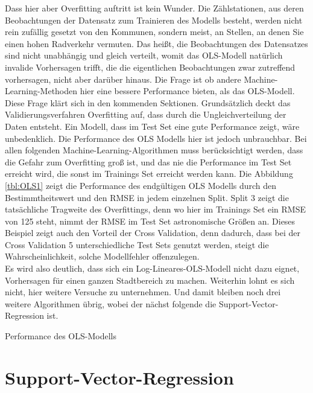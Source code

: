 \documentclass[a4paper,12pt]{thesis}
\begin{document}
Dass hier aber Overfitting auftritt ist kein Wunder. Die Zählstationen, aus deren Beobachtungen der Datensatz zum Trainieren des Modells besteht, werden nicht rein zufällig gesetzt von den Kommunen, sondern meist, an Stellen, an denen Sie einen hohen Radverkehr vermuten. Das heißt, die Beobachtungen des Datensatzes sind nicht unabhängig und gleich verteilt, womit das OLS-Modell natürlich invalide Vorhersagen trifft, die die eigentlichen Beobachtungen zwar zutreffend vorhersagen, nicht aber darüber hinaus. Die Frage ist ob andere Machine-Learning-Methoden hier eine bessere Performance bieten, als das OLS-Modell. Diese Frage klärt sich in den kommenden Sektionen. Grundsätzlich deckt das Validierungsverfahren Overfitting auf, dass durch die Ungleichverteilung der Daten entsteht. Ein Modell, dass im Test Set eine gute Performance zeigt, wäre unbedenklich. Die Performance des OLS Modells hier ist jedoch unbrauchbar. Bei allen folgenden Machine-Learning-Algorithmen muss berücksichtigt werden, dass die Gefahr zum Overfitting groß ist, und das nie die Performance im Test Set erreicht wird, die sonst im Trainings Set erreicht werden kann. Die Abbildung \ref{tbl:OLS1} zeigt die Performance des endgültigen OLS Modells durch den Bestimmtheitswert und den RMSE in jedem einzelnen Split. Split 3 zeigt die tatsächliche Tragweite des Overfittings, denn wo hier im Trainings Set ein RMSE von 125 steht, nimmt der RMSE im Test Set astronomische Größen an. Dieses Beispiel zeigt auch den Vorteil der Cross Validation, denn dadurch, dass bei der Cross Validation 5 unterschiedliche Test Sets genutzt werden, steigt die Wahrscheinlichkeit, solche Modellfehler offenzulegen.\\
Es wird also deutlich, dass sich ein Log-Lineares-OLS-Modell nicht dazu eignet, Vorhersagen für einen ganzen Stadtbereich zu machen. Weiterhin lohnt es sich nicht, hier weitere Versuche zu unternehmen. Und damit bleiben noch drei weitere Algorithmen übrig, wobei der nächst folgende die Support-Vector-Regression ist.

\begin{table}
	\caption{Performance des OLS-Modells}
	\label{tbl:OLS1}
\end{table}

\section{Support-Vector-Regression}
\end{document}
